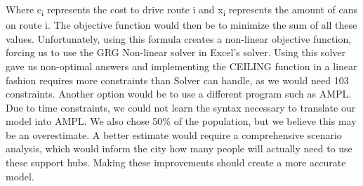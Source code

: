\documentclass{article}
\begin{document}
Where c\textsubscript{i} represents the cost to drive route i and x\textsubscript{i} represents the amount of cans on route i. The objective function would then be to minimize the sum of all these values. Unfortunately, using this formula creates a non-linear objective function, forcing us to use the GRG Non-linear solver in Excel's solver. Using this solver gave us non-optimal answers and implementing the CEILING function in a linear fashion requires more constraints than Solver can handle, as we would need 103 constraints. Another option would be to use a different program such as AMPL. Due to time constraints, we could not learn the syntax necessary to translate our model into AMPL. We also chose 50\% of the population, but we believe this may be an overestimate. A better estimate would require a comprehensive scenario analysis, which would inform the city how many people will actually need to use these support hubs. Making these improvements should create a more accurate model.
\end{document}
